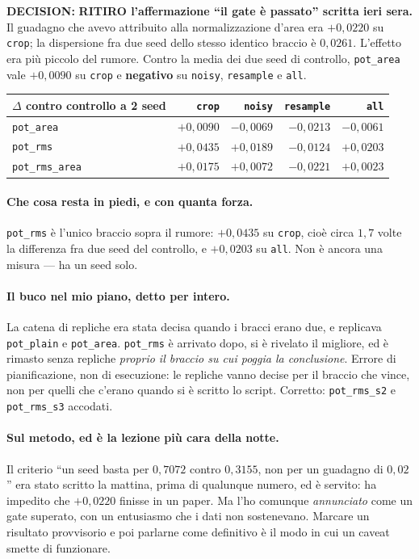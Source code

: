 \documentclass[11pt,a4paper]{article}
\newcommand{\decision}[1]{\textcolor{decision}{\textbf{DECISION:}} #1}
\begin{document}
\decision{\textbf{RITIRO l'affermazione ``il gate \`e passato'' scritta ieri sera.} Il guadagno
che avevo attribuito alla normalizzazione d'area era $+0{,}0220$ su \texttt{crop}; la dispersione
fra due seed dello stesso identico braccio \`e $0{,}0261$. L'effetto era pi\`u piccolo del rumore.
Contro la media dei due seed di controllo, \texttt{pot\_area} vale $+0{,}0090$ su \texttt{crop} e
\textbf{negativo} su \texttt{noisy}, \texttt{resample} e \texttt{all}.}

\begin{center}\small
\begin{tabular}{lrrrr}
\toprule
$\Delta$ contro controllo a 2 seed & \texttt{crop} & \texttt{noisy} & \texttt{resample} & \texttt{all} \\
\midrule
\texttt{pot\_area}     & $+0{,}0090$ & $-0{,}0069$ & $-0{,}0213$ & $-0{,}0061$ \\
\texttt{pot\_rms}      & $+0{,}0435$ & $+0{,}0189$ & $-0{,}0124$ & $+0{,}0203$ \\
\texttt{pot\_rms\_area}& $+0{,}0175$ & $+0{,}0072$ & $-0{,}0221$ & $+0{,}0023$ \\
\bottomrule
\end{tabular}
\end{center}

\paragraph{Che cosa resta in piedi, e con quanta forza.} \texttt{pot\_rms} \`e l'unico braccio
sopra il rumore: $+0{,}0435$ su \texttt{crop}, cio\`e circa $1{,}7$ volte la differenza fra due
seed del controllo, e $+0{,}0203$ su \texttt{all}. Non \`e ancora una misura --- ha un seed solo.

\paragraph{Il buco nel mio piano, detto per intero.} La catena di repliche era stata decisa
quando i bracci erano due, e replicava \texttt{pot\_plain} e \texttt{pot\_area}. \texttt{pot\_rms}
\`e arrivato dopo, si \`e rivelato il migliore, ed \`e rimasto senza repliche \emph{proprio il
braccio su cui poggia la conclusione}. Errore di pianificazione, non di esecuzione: le repliche
vanno decise per il braccio che vince, non per quelli che c'erano quando si \`e scritto lo script.
Corretto: \texttt{pot\_rms\_s2} e \texttt{pot\_rms\_s3} accodati.

\paragraph{Sul metodo, ed \`e la lezione pi\`u cara della notte.} Il criterio ``un seed basta per
$0{,}7072$ contro $0{,}3155$, non per un guadagno di $0{,}02$'' era stato scritto la mattina,
prima di qualunque numero, ed \`e servito: ha impedito che $+0{,}0220$ finisse in un paper. Ma
l'ho comunque \emph{annunciato} come un gate superato, con un entusiasmo che i dati non
sostenevano. Marcare un risultato provvisorio e poi parlarne come definitivo \`e il modo in cui
un caveat smette di funzionare.
\end{document}
